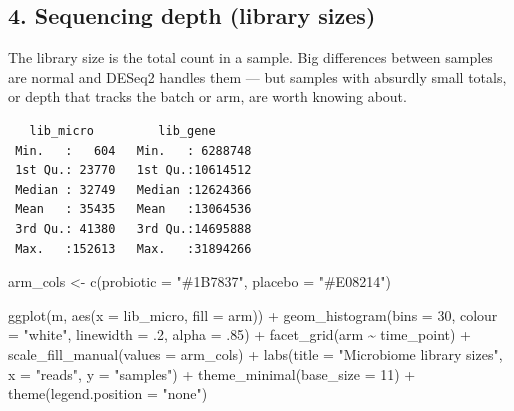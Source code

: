 \documentclass[
  letterpaper,
  DIV=11,
  numbers=noendperiod]{scrartcl}
\newenvironment{Shaded}{\begin{snugshade}}{\end{snugshade}}
\newcommand{\AttributeTok}[1]{\textcolor[rgb]{0.40,0.45,0.13}{#1}}
\newcommand{\DecValTok}[1]{\textcolor[rgb]{0.68,0.00,0.00}{#1}}
\newcommand{\FunctionTok}[1]{\textcolor[rgb]{0.28,0.35,0.67}{#1}}
\newcommand{\NormalTok}[1]{\textcolor[rgb]{0.00,0.23,0.31}{#1}}
\newcommand{\OtherTok}[1]{\textcolor[rgb]{0.00,0.23,0.31}{#1}}
\newcommand{\SpecialCharTok}[1]{\textcolor[rgb]{0.37,0.37,0.37}{#1}}
\newcommand{\StringTok}[1]{\textcolor[rgb]{0.13,0.47,0.30}{#1}}
\newcounter{none} %
\begin{document}
\subsection{4. Sequencing depth (library
sizes)}\label{sequencing-depth-library-sizes}

The library size is the total count in a sample. Big differences between
samples are normal and DESeq2 handles them --- but samples with absurdly
small totals, or depth that tracks the batch or arm, are worth knowing
about.

\begin{Shaded}
\end{Shaded}

\begin{verbatim}
   lib_micro         lib_gene       
 Min.   :   604   Min.   : 6288748  
 1st Qu.: 23770   1st Qu.:10614512  
 Median : 32749   Median :12624366  
 Mean   : 35435   Mean   :13064536  
 3rd Qu.: 41380   3rd Qu.:14695888  
 Max.   :152613   Max.   :31894266  
\end{verbatim}

\begin{Shaded}
\begin{Highlighting}[]
\NormalTok{arm\_cols }\OtherTok{\textless{}{-}} \FunctionTok{c}\NormalTok{(}\AttributeTok{probiotic =} \StringTok{"\#1B7837"}\NormalTok{, }\AttributeTok{placebo =} \StringTok{"\#E08214"}\NormalTok{)}

\FunctionTok{ggplot}\NormalTok{(m, }\FunctionTok{aes}\NormalTok{(}\AttributeTok{x =}\NormalTok{ lib\_micro, }\AttributeTok{fill =}\NormalTok{ arm)) }\SpecialCharTok{+}
  \FunctionTok{geom\_histogram}\NormalTok{(}\AttributeTok{bins =} \DecValTok{30}\NormalTok{, }\AttributeTok{colour =} \StringTok{"white"}\NormalTok{, }\AttributeTok{linewidth =}\NormalTok{ .}\DecValTok{2}\NormalTok{, }\AttributeTok{alpha =}\NormalTok{ .}\DecValTok{85}\NormalTok{) }\SpecialCharTok{+}
  \FunctionTok{facet\_grid}\NormalTok{(arm }\SpecialCharTok{\textasciitilde{}}\NormalTok{ time\_point) }\SpecialCharTok{+}
  \FunctionTok{scale\_fill\_manual}\NormalTok{(}\AttributeTok{values =}\NormalTok{ arm\_cols) }\SpecialCharTok{+}
  \FunctionTok{labs}\NormalTok{(}\AttributeTok{title =} \StringTok{"Microbiome library sizes"}\NormalTok{, }\AttributeTok{x =} \StringTok{"reads"}\NormalTok{, }\AttributeTok{y =} \StringTok{"samples"}\NormalTok{) }\SpecialCharTok{+}
  \FunctionTok{theme\_minimal}\NormalTok{(}\AttributeTok{base\_size =} \DecValTok{11}\NormalTok{) }\SpecialCharTok{+}
  \FunctionTok{theme}\NormalTok{(}\AttributeTok{legend.position =} \StringTok{"none"}\NormalTok{)}
\end{Highlighting}
\end{Shaded}
\end{document}
